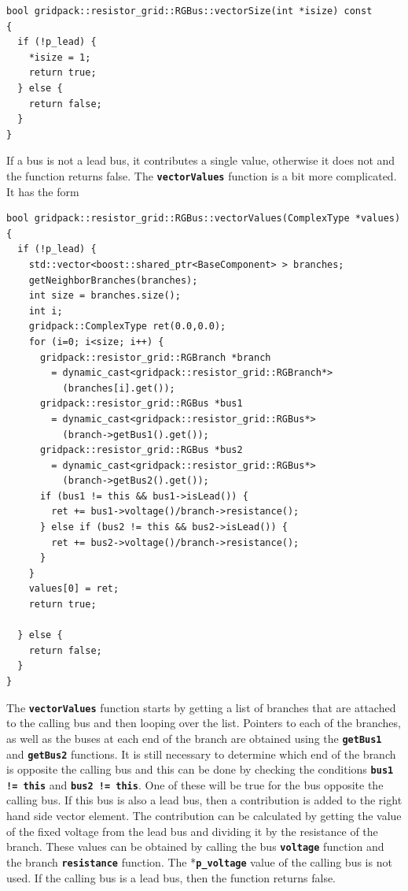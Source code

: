 \documentclass[12pt]{report} %
\begin{document}
{
\color{red}
\begin{Verbatim}[fontseries=b]
bool gridpack::resistor_grid::RGBus::vectorSize(int *isize) const
{
  if (!p_lead) {
    *isize = 1;
    return true;
  } else {
    return false;
  }
}
\end{Verbatim}
}

If a bus is not a lead bus, it contributes a single value, otherwise it does not and the function returns false. The \texttt{\textbf{vectorValues}} function is a bit more complicated. It has the form

{
\color{red}
\begin{Verbatim}[fontseries=b]
bool gridpack::resistor_grid::RGBus::vectorValues(ComplexType *values)
{
  if (!p_lead) {
    std::vector<boost::shared_ptr<BaseComponent> > branches;
    getNeighborBranches(branches);
    int size = branches.size();
    int i;
    gridpack::ComplexType ret(0.0,0.0);
    for (i=0; i<size; i++) {
      gridpack::resistor_grid::RGBranch *branch
        = dynamic_cast<gridpack::resistor_grid::RGBranch*>
          (branches[i].get());
      gridpack::resistor_grid::RGBus *bus1
        = dynamic_cast<gridpack::resistor_grid::RGBus*>
          (branch->getBus1().get());
      gridpack::resistor_grid::RGBus *bus2
        = dynamic_cast<gridpack::resistor_grid::RGBus*>
          (branch->getBus2().get());
      if (bus1 != this && bus1->isLead()) {
        ret += bus1->voltage()/branch->resistance();
      } else if (bus2 != this && bus2->isLead()) {
        ret += bus2->voltage()/branch->resistance();
      }
    }
    values[0] = ret;
    return true;

  } else {
    return false;
  }
}
\end{Verbatim}
}

The \texttt{\textbf{vectorValues}} function starts by getting a list of branches that are attached to the calling bus and then looping over the list. Pointers to each of the branches, as well as the buses at each end of the branch are obtained using the \texttt{\textbf{getBus1}} and \texttt{\textbf{getBus2}} functions. It is still necessary to determine which end of the branch is opposite the calling bus and this can be done by checking the conditions \texttt{\textbf{bus1 != this}} and \texttt{\textbf{bus2 != this}}. One of these will be true for the bus opposite the calling bus. If this bus is also a lead bus, then a contribution is added to the right hand side vector element. The contribution can be calculated by getting the value of the fixed voltage from the lead bus and dividing it by the resistance of the branch. These values can be obtained by calling the bus \texttt{\textbf{voltage}} function and the branch \texttt{\textbf{resistance}} function. The *\texttt{\textbf{p\_voltage}} value of the calling bus is not used. If the calling bus is a lead bus, then the function returns false.
\end{document}
